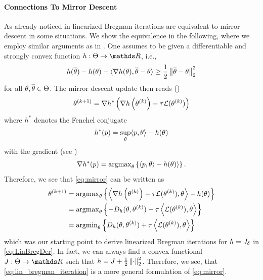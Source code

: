 \paragraph{Connections To Mirror Descent}
As already noticed in \cite{villa2023implicit} linearized Bregman iterations are equivalent to mirror descent in some situations. We show the equivalence in the following, where we employ similar arguments as in \cite{beck2003mirror}.
%
One assumes to be given a differentiable and strongly convex function $h:\Param\to\R$, i.e.,
%
\begin{align*}
h(\overline{\theta}) - h(\theta) - \langle\nabla h(\theta), \overline{\theta} - \theta \rangle \geq  
\frac{1}{2} \left\|\overline{\theta} - \theta\right\|^2_2
\end{align*}
%
for all $\theta,\overline{\theta}\in\Theta$. The mirror descent update then reads (\cite{nemirovskij1983problem, beck2003mirror})
%
\begin{align}\label{eq:mirror}
\theta^{(k+1)} = \nabla h^\ast\left(\nabla h\left(\theta^{(k)}\right) - \tau \mathcal{L}(\theta^{(k)})\right)
\end{align}
%
where $h^\ast$ denotes the Fenchel conjugate
%
\begin{align*}
h^\ast(p) = \sup_{\theta} \langle p, \theta\rangle - h(\theta)
\end{align*}
%
with the gradient (see \cite{boyd2004convex})
%
\begin{align*}
\nabla h^\ast(p) = \operatorname{argmax}_{\theta} \left\{ \langle p, \theta\rangle - h(\theta)\rangle\right\}.
\end{align*}
%
Therefore, we see that \cref{eq:mirror} can be written as
%
\begin{align*}
\theta^{(k+1)} &= \operatorname{argmax}_\theta
\left\{\left\langle\nabla h\left(\theta^{(k)}\right) - \tau \mathcal{L}(\theta^{(k)}), \theta \right\rangle - h(\theta)\right\}\\
&=
\operatorname{argmax}_\theta \left\{-D_h(\theta, \theta^{(k)})-\tau\left\langle \mathcal{L}(\theta^{(k)}), \theta \right\rangle\right\}\\
&=
\operatorname{argmin}_\theta \left\{D_h(\theta, \theta^{(k)})+\tau\left\langle \mathcal{L}(\theta^{(k)}), \theta \right\rangle\right\}
\end{align*}
%
which was our starting point to derive linearized Bregman iterations for $h=J_{\delta}$ in \cref{eq:LinBregDer}. In fact, we can always find a convex functional $\func:\Theta\to\R$ such that $h = J + \frac{1}{2}\left\|\cdot\right\|_2^2$. Therefore, we see, that \cref{eq:lin_bregman_iteration} is a more general formulation of \cref{eq:mirror}.
%
%
